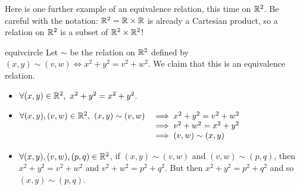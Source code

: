 Here is one further example of an equivalence relation, this time on $\mathbb{R}^2$. Be careful with the notation: $\mathbb{R}^2=\mathbb{R}\times\mathbb{R}$ is already a Cartesian product, so a relation on $\mathbb{R}^2$ is a subset of $\mathbb{R}^2\times\mathbb{R}^2$!


\begin{example}{}{equivcircle}
Let $\sim$ be the relation on $\mathbb{R}^2$ defined by $(x,y)\sim(v,w)\iff x^2+y^2=v^2+w^2$. We claim that this is an equivalence relation.
	\begin{itemize}
		\item {} $\forall (x,y)\in\R^2,\ x^2+y^2=x^2+y^2$.
		\item \symm $\begin{array}[t]{@{}rl}
		\forall (x,y),(v,w)\in\R^2,\ (x,y)\sim(v,w)&\implies x^2+y^2=v^2+w^2\\
		&\implies v^2+w^2=x^2+y^2\\
		&\implies (v,w)\sim(x,y)
		\end{array}$
		\item \trans $\forall (x,y),(v,w),(p,q)\in\mathbb{R}^2$, if $(x,y)\sim (v,w)$ and $(v,w)\sim (p,q)$, then $x^2+y^2=v^2+w^2$ and $v^2+w^2=p^2+q^2$. But then $x^2+y^2=p^2+q^2$ and so $(x,y)\sim (p,q)$.
	\end{itemize}
	

\end{example}
